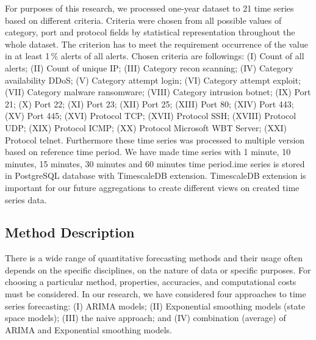 \documentclass[runningheads]{llncs}
\begin{document}
For purposes of this research, we processed one-year dataset to 21 time series based on different criteria. Criteria were chosen from all possible values of category, port and protocol fields by statistical representation throughout the whole dataset. The criterion has to meet the requirement occurrence of the value in at least 1\,\% alerts of all alerts. Chosen criteria are followings: (I) Count of all alerts; (II) Count of unique IP; (III) Category recon scanning; (IV) Category availability DDoS; (V) Category attempt login; (VI) Category attempt exploit; (VII) Category malware ransomware; (VIII) Category intrusion botnet; (IX) Port 21; (X) Port 22; (XI) Port 23; (XII) Port 25; (XIII) Port 80; (XIV) Port 443; (XV) Port 445; (XVI) Protocol TCP; (XVII) Protocol SSH; (XVIII) Protocol UDP; (XIX) Protocol ICMP; (XX) Protocol Microsoft WBT Server; (XXI) Protocol telnet. Furthermore these time series was processed to multiple version based on reference time period. We have made time series with 1 minute, 10 minutes, 15 minutes, 30 minutes and 60 minutes time period.ime series is stored in PostgreSQL database with TimescaleDB extension. TimescaleDB extension is important for our future aggregations to create different views on created time series data.



\subsection{Method Description}

There is a wide range of quantitative forecasting methods and their usage often depends on the specific disciplines, on the  nature of data or specific purposes. For choosing a particular method, properties, accuracies, and computational costs must be considered. In our research, we have considered four approaches to time series forecasting: (I) ARIMA models; (II) Exponential smoothing models (state space models); (III) the naive approach; and (IV) combination (average) of ARIMA and Exponential smoothing models.
\end{document}
